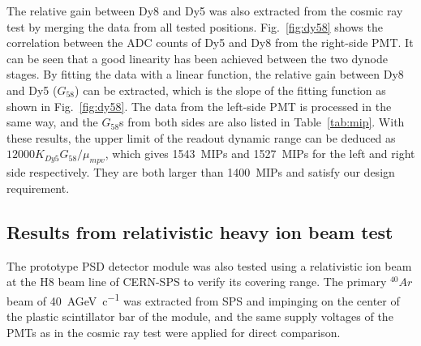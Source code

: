 \documentclass[preprint, times]{elsarticle}
\begin{document}
The relative gain between Dy8 and Dy5 was also extracted from the cosmic ray test by merging the data from all tested positions.
Fig.~\ref{fig:dy58} shows the correlation between the ADC counts of Dy5 and Dy8 from the right-side PMT.
It can be seen that a good linearity has been achieved between the two dynode stages.
By fitting the data with a linear function, the relative gain between Dy8 and Dy5 ($G_{58}$) can be extracted, which is the slope of the fitting function as shown in Fig.~\ref{fig:dy58}.
The data from the left-side PMT is processed in the same way, and the $G_{58}$s from both sides are also listed in Table~\ref{tab:mip}.
With these results, the upper limit of the readout dynamic range can be deduced as $12000K_{Dy5}G_{58}/\mu_{mpv}$, which gives \SI{1543}{MIPs} and \SI{1527}{MIPs} for the left and right side respectively.
They are both larger than \SI{1400}{MIPs} and satisfy our design requirement.


\subsection{Results from relativistic heavy ion beam test}
\label{sec:beam}
The prototype PSD detector module was also tested using a relativistic ion beam at the H8 beam line of CERN-SPS to verify its covering range.
The primary $^{40}{Ar}$ beam of \SI{40}{AGeV\per c} was extracted from SPS and impinging on the center of the plastic scintillator bar of the module, and the same supply voltages of the PMTs as in the cosmic ray test were applied for direct comparison.
\end{document}
